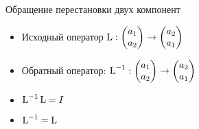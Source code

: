 \begin{frame}{Обращение перестановки двух компонент}

\begin{itemize}[<+->]
    \item 
Исходный оператор $\operatorname{L} : \begin{pmatrix}
  a_1 \\
  a_2 \\
\end{pmatrix} \to
\begin{pmatrix}
a_2 \\
a_1 \\
\end{pmatrix}
$

\item \alert{Обратный оператор}:  
$\operatorname{L}^{-1} : \begin{pmatrix}
a_1 \\
a_2 \\
    \end{pmatrix} \to
  \begin{pmatrix}
a_2 \\
a_1 \\
    \end{pmatrix}
  $

\item $\operatorname{L}^{-1} \operatorname{L} = I$
\item $\operatorname{L}^{-1} = \operatorname{L}$
\end{itemize}


\end{frame}
    



